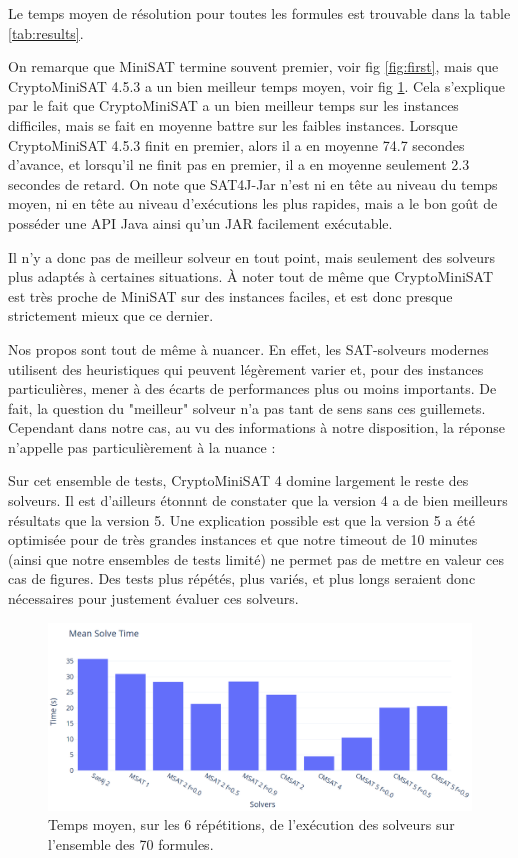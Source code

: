 \documentclass[11pt,a4paper]{article}
\begin{document}
Le temps moyen de résolution pour toutes les formules est trouvable dans la table \ref{tab:results}.


On remarque que MiniSAT termine souvent premier, voir fig \ref{fig:first}, mais que CryptoMiniSAT 4.5.3 a un bien meilleur temps moyen, voir fig \ref{fig:mean}. Cela s'explique par le fait que CryptoMiniSAT a un bien meilleur temps sur les instances difficiles, mais se fait en moyenne battre sur les faibles instances.
Lorsque CryptoMiniSAT 4.5.3 finit en premier, alors il a en moyenne 74.7 secondes d'avance, et lorsqu'il ne finit pas en premier, il a en moyenne seulement 2.3 secondes de retard.
On note que SAT4J-Jar n'est ni en tête au niveau du temps moyen, ni en tête au niveau d'exécutions les plus rapides, mais a le bon goût de posséder une API Java ainsi qu'un JAR facilement exécutable.

Il n'y a donc pas de meilleur solveur en tout point, mais seulement des solveurs plus adaptés à certaines situations. À noter tout de même que CryptoMiniSAT est très proche de MiniSAT sur des instances faciles, et est donc presque strictement mieux que ce dernier.

Nos propos sont tout de même à nuancer.
En effet, les SAT-solveurs modernes utilisent des heuristiques qui peuvent légèrement varier et, pour des instances particulières, mener à des écarts de performances plus ou moins importants. De fait, la question du "meilleur" solveur n'a pas tant de sens sans ces guillemets. Cependant dans notre cas, au vu des informations à notre disposition, la réponse n'appelle pas particulièrement à la nuance :

Sur cet ensemble de tests, CryptoMiniSAT 4 domine largement le reste des solveurs.
Il est d'ailleurs étonnnt de constater que la version 4 a de bien meilleurs résultats que la version 5. Une explication possible est que la version 5 a été optimisée pour de très grandes instances et que notre timeout de 10 minutes (ainsi que notre ensembles de tests limité) ne permet pas de mettre en valeur ces cas de figures. Des tests plus répétés, plus variés, et plus longs seraient donc nécessaires pour justement évaluer ces solveurs.

\begin{figure}
  \includegraphics[width=0.6\linewidth]{plot-mean.png}
  \caption{Temps moyen, sur les 6 répétitions, de l'exécution des solveurs sur l'ensemble des 70 formules. }
  \label{fig:mean}
\end{figure}
\end{document}
